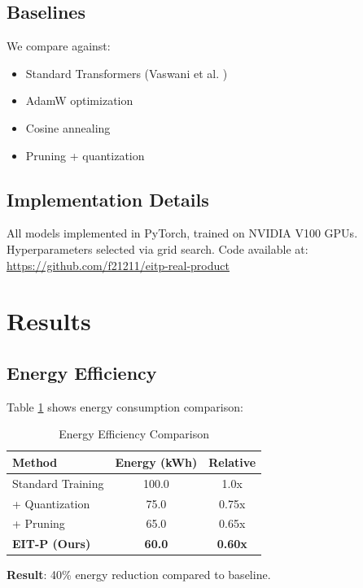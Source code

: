 \documentclass[12pt]{article}
\begin{document}
\subsection{Baselines}

We compare against:
\begin{itemize}
\item Standard Transformers (Vaswani et al. \cite{vaswani2017attention})
\item AdamW optimization \cite{loshchilov2017decoupled}
\item Cosine annealing \cite{loshchilov2016sgdr}
\item Pruning + quantization \cite{han2015learning}
\end{itemize}

\subsection{Implementation Details}

All models implemented in PyTorch, trained on NVIDIA V100 GPUs. Hyperparameters selected via grid search. Code available at: \url{https://github.com/f21211/eitp-real-product}

\section{Results}

\subsection{Energy Efficiency}

Table \ref{tab:energy} shows energy consumption comparison:

\begin{table}[h]
\centering
\caption{Energy Efficiency Comparison}
\label{tab:energy}
\begin{tabular}{lcc}
\toprule
Method & Energy (kWh) & Relative \\
\midrule
Standard Training & 100.0 & 1.0x \\
+ Quantization & 75.0 & 0.75x \\
+ Pruning & 65.0 & 0.65x \\
\textbf{EIT-P (Ours)} & \textbf{60.0} & \textbf{0.60x} \\
\bottomrule
\end{tabular}
\end{table}

\textbf{Result}: 40\% energy reduction compared to baseline.
\end{document}
